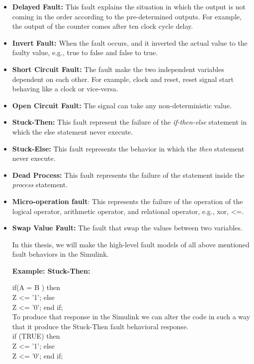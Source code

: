 \begin{itemize}
\item \textbf{Delayed Fault:} This fault explains the situation in which the output is not coming in the order according to the pre-determined outputs. For example, the output of the counter comes after ten clock cycle delay.



\item \textbf{Invert Fault:} When the fault occurs, and it inverted the actual value to the faulty value, e.g., true to false and false to true.

\item \textbf{Short Circuit Fault:} The fault make the two independent variables dependent on each other. For example, clock and reset, reset signal start behaving like a clock or vice-versa.

\item \textbf{Open Circuit Fault:} The signal can take any non-deterministic value.

\item \textbf{Stuck-Then:} This fault represent the failure of the \textit{if-then-else} statement in which the else statement never execute.

\item \textbf{Stuck-Else:} This fault represents the behavior in which the \textit{then} statement never execute.

\item \textbf{Dead Process:} This fault represents the failure of the statement inside the \textit{process} statement. 

\item \textbf{Micro-operation fault}: This represents the failure of the operation of the logical operator, arithmetic operator, and relational operator, e.g., xor, <=.   


\item \textbf{Swap Value Fault:} The fault that swap the values between two variables.


In this thesis, we will make the high-level fault models of all above mentioned fault behaviors in the Simulink. 



\textbf{Example: Stuck-Then:}

if(A = B ) then \\
\hspace{0.4 cm} Z <= '1'; else \\
\hspace{0.4 cm} Z <= '0'; end if; \\
 
To produce that response in the Simulink we can alter the code in such a way that it produce the Stuck-Then fault behavioral response.
\\
if (TRUE) then  \\
\hspace{0.4 cm} Z <= '1'; else \\
\hspace{0.4 cm} Z <= '0'; end if; \\







\end{itemize}
